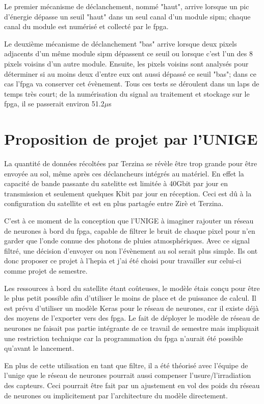 Le premier mécanisme de déclanchement, nommé "haut", arrive lorsque un pic d'énergie dépasse un seuil "haut" dans un seul canal
d'un module \gls{sipm}; chaque canal du module est numérisé et collecté par le \gls{fpga}. 

Le deuxième mécanisme de déclanchement "bas" arrive lorsque deux pixels adjacents d'un même module \gls{sipm}
dépassent ce seuil ou lorsque c'est l'un des 8 pixels voisins d'un autre module. 
Ensuite, les pixels voisins sont analysés pour déterminer si au moins deux d'entre eux ont aussi dépassé ce seuil "bas"; dans ce cas l'\gls{fpga} va conserver cet évènement.
Tous ces tests se déroulent dans un laps de temps très court; de la numérisation du signal au traitement et stockage sur le \gls{fpga}, il se passerait environ 51.2$\mu$s

\section{Proposition de projet par l'UNIGE}

La quantité de données récoltées par Terzina se révèle être trop grande pour être envoyée au sol, même après ces déclancheurs intégrés au matériel.
En effet la capacité de bande passante du satelitte est limitée à 40Gbit par jour en transmission et seulement quelques Kbit par jour en réception.
Ceci est dû à la configuration du satellite et est en plus partagée entre Zirè et Terzina.

C'est à ce moment de la conception que l'UNIGE à imaginer rajouter un réseau de neurones à bord du \gls{fpga}, capable de filtrer
le bruit de chaque pixel pour n'en garder que l'onde connue des photons de pluies atmosphériques. 
Avec ce signal filtré, une décision d'envoyer ou non l'évènement au sol serait plus simple. 
Ils ont donc proposer ce projet à l'\gls{hepia} et j'ai été choisi pour travailler sur celui-ci comme projet de semestre.

Les ressources à bord du satellite étant coûteuses, le modèle étais conçu pour être le plus petit possible 
afin d'utiliser le moins de place et de puissance de calcul.
Il est prévu d'utiliser un modèle Keras pour le réseau de neurones, car il existe déjà des moyens de l'exporter vers des \gls{fpga}.
Le fait de déployer le modèle de réseau de neurones ne faisait pas partie intégrante de ce travail de semestre mais impliquait une
restriction technique car la programmation du \gls{fpga} n'aurait été possible qu'avant le lancement.

En plus de cette utilisation en tant que filtre, il a été théorisé avec l'équipe de l'\gls{unige} que le réseau de neurones
pourrait aussi compenser l'usure/l'irradiation des capteurs. Ceci pourrait être fait par un ajustement en vol des poids du réseau de neurones 
ou implicitement par l'architecture du modèle directement.

